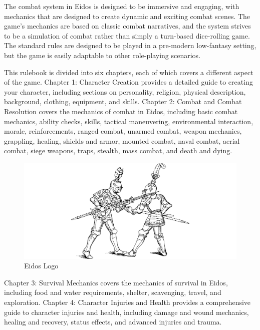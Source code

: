 \documentclass[twocolumn,12pt]{article}  %
\begin{document}
The combat system in Eidos is designed to be immersive and engaging, with mechanics that are designed to create dynamic and exciting combat scenes. The game's mechanics are based on classic combat narratives, and the system strives to be a simulation of combat rather than simply a turn-based dice-rolling game. The standard rules are designed to be played in a pre-modern low-fantasy setting, but the game is easily adaptable to other role-playing scenarios.

This rulebook is divided into six chapters, each of which covers a different aspect of the game. Chapter 1: Character Creation provides a detailed guide to creating your character, including sections on personality, religion, physical description, background, clothing, equipment, and skills. Chapter 2: Combat and Combat Resolution covers the mechanics of combat in Eidos, including basic combat mechanics, ability checks, skills, tactical maneuvering, environmental interaction, morale, reinforcements, ranged combat, unarmed combat, weapon mechanics, grappling, healing, shields and armor, mounted combat, naval combat, aerial combat, siege weapons, traps, stealth, mass combat, and death and dying.

\onecolumn
\begin{figure}[H]  %
    \centering
    \includegraphics[width=\linewidth]{./images/index02.pdf}
    \caption{Eidos Logo}
\end{figure}
\twocolumn  %

Chapter 3: Survival Mechanics covers the mechanics of survival in Eidos, including food and water requirements, shelter, scavenging, travel, and exploration. Chapter 4: Character Injuries and Health provides a comprehensive guide to character injuries and health, including damage and wound mechanics, healing and recovery, status effects, and advanced injuries and trauma.
\end{document}
